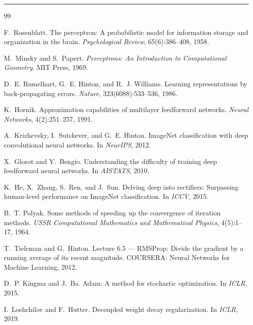 \documentclass[11pt, a4paper]{article}
\begin{document}
\bigskip
\hrule
\bigskip


\begin{thebibliography}{99}

F.~Rosenblatt.
\newblock The perceptron: A probabilistic model for information storage and organization in the brain.
\newblock \emph{Psychological Review}, 65(6):386--408, 1958.

M.~Minsky and S.~Papert.
\newblock \emph{Perceptrons: An Introduction to Computational Geometry}.
\newblock MIT Press, 1969.

D.~E. Rumelhart, G.~E. Hinton, and R.~J. Williams.
\newblock Learning representations by back-propagating errors.
\newblock \emph{Nature}, 323(6088):533--536, 1986.

K.~Hornik.
\newblock Approximation capabilities of multilayer feedforward networks.
\newblock \emph{Neural Networks}, 4(2):251--257, 1991.

A.~Krizhevsky, I.~Sutskever, and G.~E. Hinton.
\newblock ImageNet classification with deep convolutional neural networks.
\newblock In \emph{NeurIPS}, 2012.

X.~Glorot and Y.~Bengio.
\newblock Understanding the difficulty of training deep feedforward neural networks.
\newblock In \emph{AISTATS}, 2010.

K.~He, X.~Zhang, S.~Ren, and J.~Sun.
\newblock Delving deep into rectifiers: Surpassing human-level performance on ImageNet classification.
\newblock In \emph{ICCV}, 2015.

B.~T. Polyak.
\newblock Some methods of speeding up the convergence of iteration methods.
\newblock \emph{USSR Computational Mathematics and Mathematical Physics}, 4(5):1--17, 1964.

T.~Tieleman and G.~Hinton.
\newblock Lecture 6.5 --- RMSProp: Divide the gradient by a running average of its recent magnitude.
\newblock COURSERA: Neural Networks for Machine Learning, 2012.

D.~P. Kingma and J.~Ba.
\newblock Adam: A method for stochastic optimization.
\newblock In \emph{ICLR}, 2015.

I.~Loshchilov and F.~Hutter.
\newblock Decoupled weight decay regularization.
\newblock In \emph{ICLR}, 2019.


\end{thebibliography}
\end{document}
